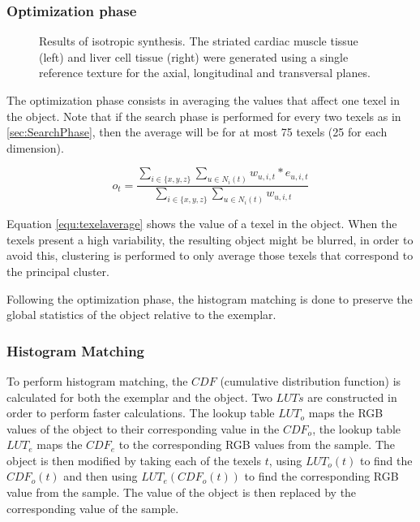 \subsubsection{Optimization phase}
\label{sec:OptimizationPhase}

\begin{figure}
 \vspace{-0.2cm}
 \centering
 \caption{Results of isotropic synthesis. The striated cardiac muscle tissue (left)
          and liver cell tissue (right) were generated using a single reference texture 
          for the axial, longitudinal and transversal planes.
         }
 \label{fig:isotropicsynthesis}
 \vspace{-0.1cm}
\end{figure}

The optimization phase consists in averaging the values that affect one texel in the object. Note that
if the search phase is performed for every two texels as in \ref{sec:SearchPhase}, 
then the average will be for at most 75 texels (25 for each dimension).

\begin{equation}
 o_t = \frac{ \sum_{i \in \{x, y, z\}} \sum_{u \in N_i(t)} w_{u, i, t} * e_{u, i, t} }{ \sum_{i \in \{x, y, z\}} \sum_{u \in N_i(t)} w_{u, i, t} }
 \label{equ:texelaverage}
\end{equation}

Equation \ref{equ:texelaverage} shows the value of a texel in the object. 
When the texels present a high variability, the resulting object might be
blurred, in order to avoid this, 
clustering is performed to only average those texels that correspond to the principal cluster.

Following the optimization phase, the histogram matching is done to preserve the 
global statistics of the object relative to the exemplar. 

\subsubsection{Histogram Matching}
\label{sec:histogramMatching}

To perform histogram matching, the $CDF$ (cumulative distribution function) is calculated for both the exemplar 
and the object. 
Two $LUTs$ are constructed in order to perform faster calculations. 
The lookup table $LUT_o$ maps the RGB values of the object
to their corresponding value in the $CDF_o$, 
the lookup table $LUT_e$ maps the $CDF_e$
to the corresponding RGB values from the sample. 
The object is then modified by taking each of the texels $t$, using $LUT_o(t)$ to find the $CDF_o(t)$
and then using $LUT_e(CDF_o(t))$ to find the corresponding RGB value from the sample. The value of the object 
is then replaced by the corresponding value of the sample.

